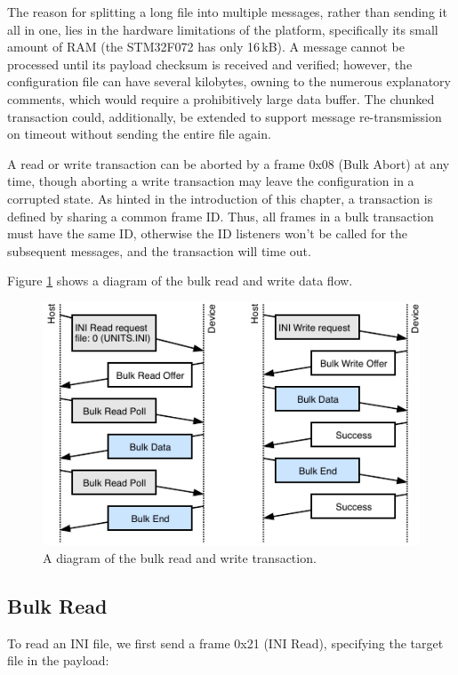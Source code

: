 The reason for splitting a long file into multiple messages, rather than sending it all in one, lies in the hardware limitations of the platform, specifically its small amount of RAM (the STM32F072 has only 16\,kB). A message cannot be processed until its payload checksum is received and verified; however, the configuration file can have several kilobytes, owning to the numerous explanatory comments, which would require a prohibitively large data buffer. The chunked transaction could, additionally, be extended to support message re-transmission on timeout without sending the entire file again.

A read or write transaction can be aborted by a frame 0x08 (Bulk Abort) at any time, though aborting a write transaction may leave the configuration in a corrupted state. As hinted in the introduction of this chapter, a transaction is defined by sharing a common frame ID. Thus, all frames in a bulk transaction must have the same ID, otherwise the ID listeners won't be called for the subsequent messages, and the transaction will time out.

Figure \ref{fig:bulk-rw} shows a diagram of the bulk read and write data flow.

\begin{figure}
	\centering
	\includegraphics[scale=1.5]{img/bulk-read-write.pdf}
	\caption{\label{fig:bulk-rw}A diagram of the bulk read and write transaction.}
\end{figure}

\subsection{Bulk Read}

To read an INI file, we first send a frame 0x21 (INI Read), specifying the target file in the payload:

